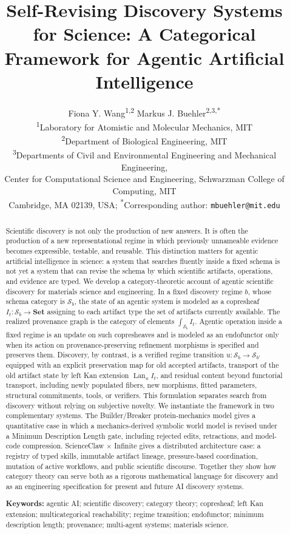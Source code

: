 \documentclass[11pt]{article}
\title{\textbf{
Self-Revising Discovery Systems for Science: A Categorical Framework for Agentic Artificial Intelligence}}
\author{%
\begin{tabular}{c}
Fiona Y. Wang\textsuperscript{1,2} \quad Markus J. Buehler\textsuperscript{2,3,*}\\[-0.1em]
\footnotesize \textsuperscript{1}Laboratory for Atomistic and Molecular Mechanics, MIT\\[-0.15em]
\footnotesize \textsuperscript{2}Department of Biological Engineering, MIT\\[-0.15em]
\footnotesize \textsuperscript{3}Departments of Civil and Environmental Engineering and Mechanical Engineering,\\[-0.15em]
\footnotesize Center for Computational Science and Engineering, Schwarzman College of Computing, MIT\\[-0.15em]
\footnotesize Cambridge, MA 02139, USA; \textsuperscript{*}Corresponding author: \texttt{mbuehler@mit.edu}
\end{tabular}
}
\date{}
\theoremstyle{definition}
\newcommand{\Sschema}{\mathcal{S}}
\newcommand{\Set}{\mathbf{Set}}
\newcommand{\Lan}{\operatorname{Lan}}
\begin{document}
\maketitle

\begin{abstract}
\noindent
Scientific discovery is not only the production of new answers. It is often the production of a new representational regime in which previously unnameable evidence becomes expressible, testable, and reusable. This distinction matters for agentic artificial intelligence in science: a system that searches fluently inside a fixed schema is not yet a system that can revise the schema by which scientific artifacts, operations, and evidence are typed.
%
We develop a category-theoretic account of agentic scientific discovery for materials science and engineering. In a fixed discovery regime $b$, whose schema category is $\Sschema_b$, the state of an agentic system is modeled as a copresheaf $I_t:\Sschema_b\to\Set$ assigning to each artifact type the set of artifacts currently available. The realized provenance graph is the category of elements $\int_{\Sschema_b} I_t$. Agentic operation inside a fixed regime is an update on such copresheaves and is modeled as an endofunctor only when its action on provenance-preserving refinement morphisms is specified and preserves them. Discovery, by contrast, is a verified regime transition $u:\Sschema_b\to\Sschema_{b'}$ equipped with an explicit preservation map for old accepted artifacts, transport of the old artifact state by left Kan extension $\Lan_u I_t$, and residual content beyond functorial transport, including newly populated fibers, new morphisms, fitted parameters, structural commitments, tools, or verifiers. This formulation separates search from discovery without relying on subjective novelty.
%
We instantiate the framework in two complementary systems. The Builder/Breaker protein-mechanics model gives a quantitative case in which a mechanics-derived symbolic world model is revised under a Minimum Description Length gate, including rejected edits, retractions, and model-code compression. ScienceClaw $\times$ Infinite gives a distributed architecture case: a registry of typed skills, immutable artifact lineage, pressure-based coordination, mutation of active workflows, and public scientific discourse. Together they show how category theory can serve both as a rigorous mathematical language for discovery and as an engineering specification for present and future AI discovery systems.

\smallskip
\noindent\textbf{Keywords:} agentic AI; scientific discovery; category theory; copresheaf; left Kan extension; multicategorical reachability; regime transition; endofunctor; minimum description length; provenance; multi-agent systems; materials science.
\end{abstract}
\end{document}
